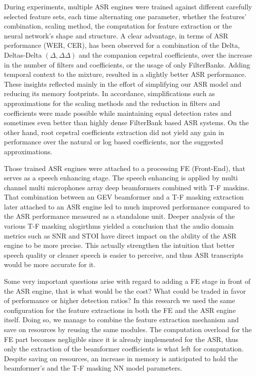During experiments,
multiple ASR engines were trained against
different carefully selected feature sets,
each time alternating one parameter,
whether the features' combination,
scaling method, the computation for feature extraction
or the neural network's shape and structure.
A clear advantage, 
in terms of ASR performance (WER, CER), 
has been observed for a combination of the
Delta, Deltas-Delta \((\Delta, \Delta\Delta)\) 
and the companion
cepstral coefficients, over the increase in the
number of filters and coefficients, 
or the usage of only FilterBanks.
Adding temporal context to the mixture,
resulted in a slightly better ASR performance.
These insights reflected mainly in 
the effort of simplifying our ASR model
and reducing its memory footprints.
In accordance, simplifications such as
approximations for the scaling methods
and the reduction in filters and coefficients
were made possible while maintaining
equal detection rates and sometimes
even better than highly dense
FilterBank based ASR systems.
On the other hand, root cepstral coefficients
extraction did not yield any gain in performance
over the natural or log based coefficients, nor
the suggested approximations.

\bigskip

Those trained ASR engines were attached to
a processing FE (Front-End), that serves as
a speech enhancing stage. The speech enhancing
is applied by multi channel multi microphones array
deep beamformers combined with T-F maskins.
That combination between an GEV beamformer 
and a T-F masking extraction later attached to
an ASR engine led to much improved
performance compared to the ASR performance
measured as a standalone unit.
Deeper analysis of the various T-F masking alogirthms
yielded a conclusion that the audio domain metrics
such as SNR and STOI have direct impact on 
the ability of the ASR engine to be more precise.
This actually strengthen the intuition that 
better speech quality or cleaner speech
is easier to perceive, and thus 
ASR transcripts would be more accurate for it.

\bigskip

Some very important questions arise with regard to 
adding a FE stage in front of the ASR engine,
that is what would be the cost? What could be traded
in favor of performance or higher detection ratios?
In this research we used the same configuration
for the feature extractions in both the
FE and the ASR engine itself. 
Doing so, we manage to combine the feature extraction
mechanism and save on resources by reusing
the same modules. The computation overload
for the FE part becomes negligible since it is 
already implemented for the ASR, thus
only the extraction of the beamformer coefficients is
what left for computation. Despite saving on resources,
an increase in memory is anticipated to hold
the beamformer's and the T-F masking NN model parameters.

